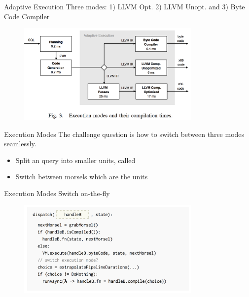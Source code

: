 \begin{frame}{Adaptive Execution}
Three modes: 1) LLVM Opt. 2) LLVM Unopt. and 3) Byte Code Compiler
\begin{figure}[htb]
\includegraphics[width=0.8\textwidth]{fig/adaptive-fig3.png}
\end{figure} 
\end{frame}

\begin{frame}{Execution Modes}
The challenge question is how to switch between three modes seamlessly.
\begin{itemize}
\item Split an query into smaller units, called 
\item Switch between morsels which are the  units
\end{itemize}
\end{frame}

\begin{frame}{Execution Modes}
Switch on-the-fly
\begin{figure}[htb]
\includegraphics[width=0.8\textwidth]{fig/adaptive-fig5.png}
\end{figure} 
\end{frame}

